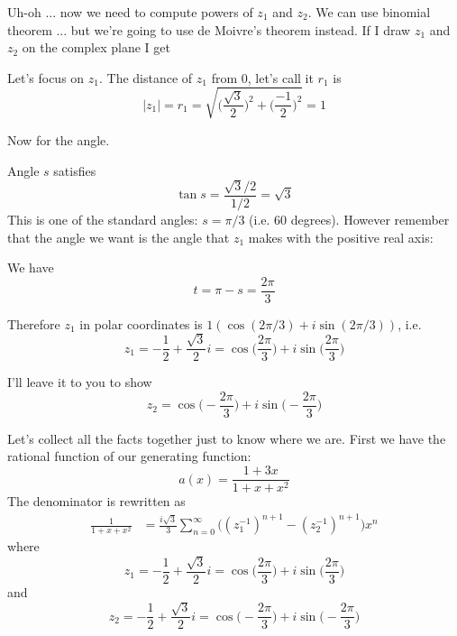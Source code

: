 Uh-oh ... now we need to compute powers of $z_1$ and $z_2$.
We can use binomial theorem ... but we're going to use de Moivre's theorem instead.
If I draw $z_1$ and $z_2$ on the complex plane I get

Let's focus on $z_1$.
The distance of $z_1$ from $0$, let's call it $r_1$ is
\[
|z_1| = r_1 = \sqrt{ \biggl( \frac{\sqrt{3}}{2} \biggr)^2 + \biggl( \frac{-1}{2} \biggr)^2 } = 1
\]



Now for the angle.

Angle $s$ satisfies
\[
\tan s = \frac{\sqrt{3}/2}{1/2} = \sqrt{3}
\]
This is one of the standard angles: $s = \pi/3$ (i.e. 60 degrees).
However remember that the angle we want is the angle that $z_1$ makes with 
the positive real axis:

We have
\[
t = \pi - s = \frac{2\pi}{3}
\]

Therefore $z_1$ in polar coordinates is $1 (\cos (2\pi/3) + i \sin(2\pi/3))$, i.e.
\[
z_1 = -\frac{1}{2} + \frac{\sqrt{3}}{2}i = \cos \biggl( \frac{2\pi}{3} \biggr) + i \sin \biggl( \frac{2\pi}{3} \biggl)
\]

I'll leave it to you to show
\[
z_2 = \cos \biggl( -\frac{2\pi}{3} \biggr) + i \sin \biggl( -\frac{2\pi}{3} \biggl)
\]

Let's collect all the facts together just to know where we are.
First we have the rational function of our generating function:
\[
a(x) = \frac{1 + 3x}{1 + x + x^2}
\]
The denominator is rewritten as
\begin{align*}
\frac{1}{1 + x + x^2}
&=
\frac{i\sqrt{3}}{3}
\sum_{n=0}^\infty 
\biggl( 
(z_1^{-1})^{n+1}  
-  (z_2^{-1})^{n+1} 
\biggr) 
x^n
\end{align*}
where
\[
z_1 = -\frac{1}{2} + \frac{\sqrt{3}}{2}i = \cos \biggl( \frac{2\pi}{3} \biggr) + i \sin \biggl( \frac{2\pi}{3} \biggl)
\]
and
\[
z_2 = -\frac{1}{2} + \frac{\sqrt{3}}{2}i = \cos \biggl( -\frac{2\pi}{3} \biggr) + i \sin \biggl( -\frac{2\pi}{3} \biggl)
\]

